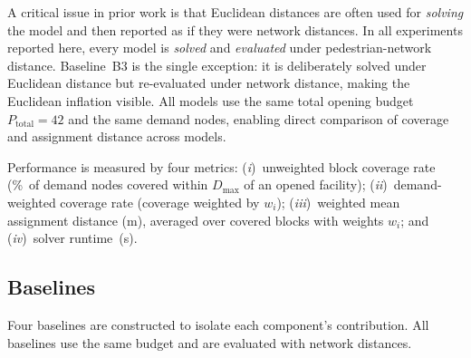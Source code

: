 A critical issue in prior work is that Euclidean distances are often used
for \emph{solving} the model and then reported as if they were network
distances.
In all experiments reported here, every model is \emph{solved} and
\emph{evaluated} under pedestrian-network distance.
Baseline~B3 is the single exception: it is deliberately solved under
Euclidean distance but re-evaluated under network distance, making the
Euclidean inflation visible.
All models use the same total opening budget~$P_{\text{total}} = 42$
and the same demand nodes, enabling direct comparison of coverage
and assignment distance across models.

Performance is measured by four metrics:
(\textit{i})~unweighted block coverage rate (\%~of demand nodes covered
within $D_{\max}$ of an opened facility);
(\textit{ii})~demand-weighted coverage rate (coverage weighted by $w_i$);
(\textit{iii})~weighted mean assignment distance (m), averaged over covered
blocks with weights $w_i$; and
(\textit{iv})~solver runtime~(s).

\subsection{Baselines}
\label{ssec:baselines}

Four baselines are constructed to isolate each component's contribution.
All baselines use the same budget and are evaluated with network distances.

